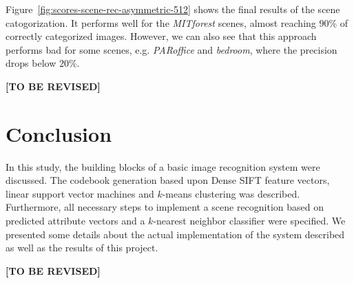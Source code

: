 \documentclass{vldb}
\newcommand{\tbr}{{\color{red}\textbf{[TO BE REVISED]}}}
\begin{document}
Figure~\ref{fig:scores-scene-rec-asymmetric-512} shows the final results of the
scene catogorization. It performs well for the \emph{MITforest} scenes,
almost reaching $90$\% of correctly categorized images. However, we can also see
that this approach performs bad for some scenes, e.g. \emph{PARoffice} and
\emph{bedroom}, where the precision drops below $20$\%.

\tbr

\section{Conclusion}
\label{sec:conclusion}

In this study, the building blocks of a basic image recognition system were
discussed. The codebook generation based upon Dense SIFT feature vectors, linear
support vector machines and $k$-means clustering was described. Furthermore, all
necessary steps to implement a scene recognition based on predicted attribute
vectors and a $k$-nearest neighbor classifier were specified. We presented some
details about the actual implementation of the system described as well as the
results of this project.

\tbr

\balance



\end{document}
